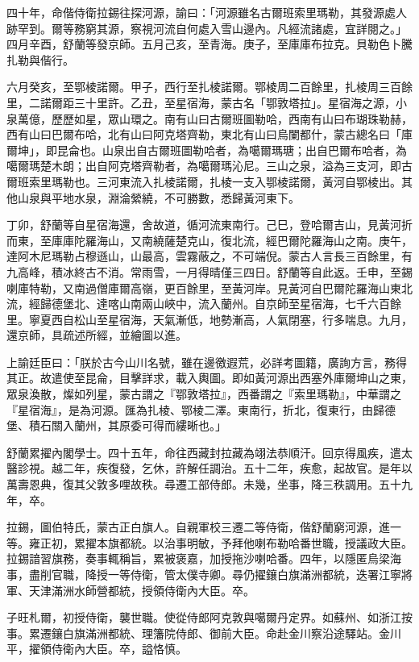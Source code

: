 \begin{pinyinscope}
四十年，命偕侍衛拉錫往探河源，諭曰：「河源雖名古爾班索里瑪勒，其發源處人跡罕到。爾等務窮其源，察視河流自何處入雪山邊內。凡經流諸處，宜詳閱之。」四月辛酉，舒蘭等發京師。五月己亥，至青海。庚子，至庫庫布拉克。貝勒色卜騰扎勒與偕行。

六月癸亥，至鄂棱諾爾。甲子，西行至扎棱諾爾。鄂棱周二百餘里，扎棱周三百餘里，二諾爾距三十里許。乙丑，至星宿海，蒙古名「鄂敦塔拉」。星宿海之源，小泉萬億，歷歷如星，眾山環之。南有山曰古爾班圖勒哈，西南有山曰布瑚珠勒赫，西有山曰巴爾布哈，北有山曰阿克塔齊勒，東北有山曰烏闌都什，蒙古總名曰「庫爾坤」，即昆侖也。山泉出自古爾班圖勒哈者，為噶爾瑪瑭；出自巴爾布哈者，為噶爾瑪楚木朗；出自阿克塔齊勒者，為噶爾瑪沁尼。三山之泉，溢為三支河，即古爾班索里瑪勒也。三河東流入扎棱諾爾，扎棱一支入鄂棱諾爾，黃河自鄂棱出。其他山泉與平地水泉，淵淪縈繞，不可勝數，悉歸黃河東下。

丁卯，舒蘭等自星宿海還，舍故道，循河流東南行。己巳，登哈爾吉山，見黃河折而東，至庫庫陀羅海山，又南繞薩楚克山，復北流，經巴爾陀羅海山之南。庚午，達阿木尼瑪勒占穆遜山，山最高，雲霧蔽之，不可端倪。蒙古人言長三百餘里，有九高峰，積冰終古不消。常雨雪，一月得晴僅三四日。舒蘭等自此返。壬申，至錫喇庫特勒，又南過僧庫爾高嶺，更百餘里，至黃河岸。見黃河自巴爾陀羅海山東北流，經歸德堡北、達喀山南兩山峽中，流入蘭州。自京師至星宿海，七千六百餘里。寧夏西自松山至星宿海，天氣漸低，地勢漸高，人氣閉塞，行多喘息。九月，還京師，具疏述所經，並繪圖以進。

上諭廷臣曰：「朕於古今山川名號，雖在邊徼遐荒，必詳考圖籍，廣詢方言，務得其正。故遣使至昆侖，目擊詳求，載入輿圖。即如黃河源出西塞外庫爾坤山之東，眾泉渙散，燦如列星，蒙古謂之『鄂敦塔拉』，西番謂之『索里瑪勒』，中華謂之『星宿海』，是為河源。匯為扎棱、鄂棱二澤。東南行，折北，復東行，由歸德堡、積石關入蘭州，其原委可得而縷晰也。」

舒蘭累擢內閣學士。四十五年，命往西藏封拉藏為翊法恭順汗。回京得風疾，遣太醫診視。越二年，疾復發，乞休，許解任調治。五十二年，疾愈，起故官。是年以萬壽恩典，復其父敦多哩故秩。尋遷工部侍郎。未幾，坐事，降三秩調用。五十九年，卒。

拉錫，圖伯特氏，蒙古正白旗人。自親軍校三遷二等侍衛，偕舒蘭窮河源，進一等。雍正初，累擢本旗都統。以治事明敏，予拜他喇布勒哈番世職，授議政大臣。拉錫諳習旗務，奏事輒稱旨，累被褒嘉，加授拖沙喇哈番。四年，以隱匿烏梁海事，盡削官職，降授一等侍衛，管太僕寺卿。尋仍擢鑲白旗滿洲都統，迭署江寧將軍、天津滿洲水師營都統，授領侍衛內大臣。卒。

子旺札爾，初授侍衛，襲世職。使從侍郎阿克敦與噶爾丹定界。如蘇州、如浙江按事。累遷鑲白旗滿洲都統、理籓院侍郎、御前大臣。命赴金川察沿途驛站。金川平，擢領侍衛內大臣。卒，謚恪慎。


\end{pinyinscope}
